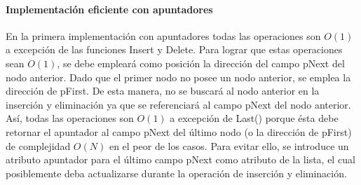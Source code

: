 \paragraph{Implementación eficiente con apuntadores}

En la primera implementación con apuntadores todas las operaciones son $O(1)$ a excepción de las funciones Insert y Delete. Para lograr que estas operaciones sean $O(1)$, se debe empleará como posición la dirección del campo pNext del nodo anterior. Dado que el primer nodo no posee un nodo anterior, se emplea la dirección de pFirst. De esta manera, no se buscará al nodo anterior en la inserción y eliminación ya que se referenciará al campo pNext del nodo anterior. Así, todas las operaciones son $O(1)$ a excepción de Last() porque ésta debe retornar el apuntador al campo pNext del último nodo (o la dirección de pFirst) de complejidad $O(N)$ en el peor de los casos. Para evitar ello, se introduce un atributo apuntador para el último campo pNext como atributo de la lista, el cual posiblemente deba actualizarse durante la operación de inserción y eliminación.
